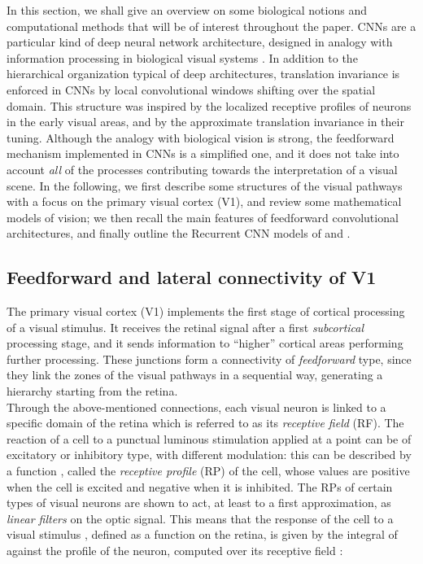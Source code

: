 \documentclass[11pt,oneside,reqno]{amsart}
\begin{document}
 In this section, we shall give an overview on some biological notions and computational methods that will be of interest throughout the paper. CNNs are a particular kind of deep neural network architecture, designed in analogy with information processing in biological visual systems \citep{fuku,lecun_cnns}. In addition to the hierarchical organization typical of deep architectures, translation invariance is enforced in CNNs by local convolutional windows shifting over the spatial domain. This structure was inspired by the localized receptive profiles of neurons in the early visual areas, and by the approximate translation invariance in their tuning. Although the analogy with biological vision is strong, the feedforward mechanism implemented in CNNs is a simplified one, and it does not take into account \emph{all} of the processes contributing towards the interpretation of a visual scene. In the following, we first describe some structures of the visual pathways with a focus on the primary visual cortex (V1), and review some mathematical models of vision; we then recall the main features of feedforward convolutional architectures, and finally outline the Recurrent CNN models of \citet{liang} and \citet{spoerer}.
 
 \subsection{Feedforward and lateral connectivity of V1}\label{v1}
 
 The primary visual cortex (V1) implements the first stage of cortical processing of a visual stimulus. It receives the retinal signal after a first \emph{subcortical} processing stage, and it sends information to ``higher'' cortical areas performing further processing. These junctions form a connectivity of \emph{feedforward} type, since they link the zones of the visual pathways in a sequential way, generating a hierarchy starting from the retina.\\
 Through the above-mentioned connections, each visual neuron is linked to a specific domain  of the retina which is referred to as its \emph{receptive field} (RF). The reaction of a cell to a punctual luminous stimulation applied at a point  can be of excitatory or inhibitory type, with different modulation: this can be described by a function , called the \emph{receptive profile} (RP) of the cell, whose values are positive when the cell is excited and negative when it is inhibited. The RPs of certain types of visual neurons are shown to act, at least to a first approximation, as \emph{linear filters} on the optic signal. This means that the response of the cell to a visual stimulus , defined as a function on the retina, is given by the integral of  against the profile  of the neuron, computed over its receptive field :
\end{document}
